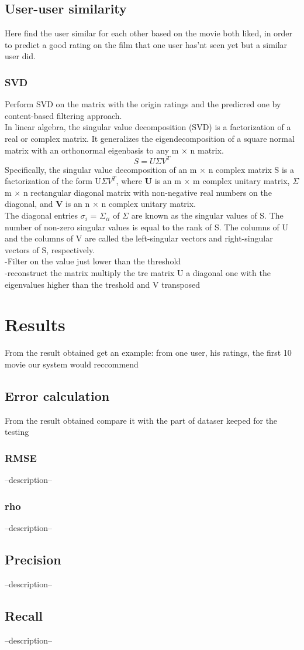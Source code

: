 \documentclass{article}
\begin{document}
\subsection{User-user similarity}
Here find the user similar for each other based on the movie both liked, in order to predict a good rating on the film that one user has'nt seen yet but a similar user did.
\subsubsection{SVD}
Perform SVD on the matrix with the origin ratings and the predicred one by content-based filtering approach.\\
In linear algebra, the singular value decomposition (SVD) is a factorization of a real or complex matrix. It generalizes the eigendecomposition of a square normal matrix with an orthonormal eigenbasis to any m × n matrix.
\begin{equation}
      S = U\Sigma V^T
\end{equation}
Specifically, the singular value decomposition of an m $\times$ n complex matrix S is a factorization of the form U$\Sigma V^T$, where \textbf{U} is an m $\times$ m complex unitary matrix, \textbf{$\Sigma$} m $\times$ n rectangular diagonal matrix with non-negative real numbers on the diagonal, and \textbf{V} is an n $\times$ n complex unitary matrix.\\
The diagonal entries $\sigma _{i}$ = $\Sigma _{ii}$ of $\Sigma$ are known as the singular values of S. The number of non-zero singular values is equal to the rank of S. The columns of U and the columns of V are called the left-singular vectors and right-singular vectors of S, respectively.\\
-Filter on the value just lower than the threshold\\
-reconstruct the matrix multiply the tre matrix U a diagonal one with the \\eigenvalues higher than the treshold and V transposed\\


\newpage

\section{Results}
From the result obtained get an example: from one user, his ratings, the first 10 movie our system would reccommend

\subsection{Error calculation}
From the result obtained compare it with the part of dataser keeped for the testing
\subsubsection{RMSE}
--description--
\subsubsection{rho}
--description--

\subsection{Precision}
--description--
\subsection{Recall}
--description--
\end{document}
